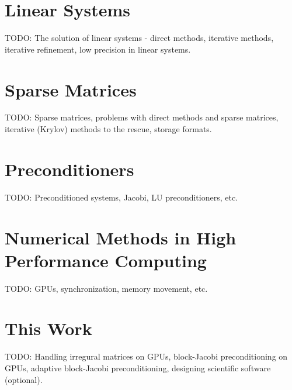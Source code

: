 

\section{Linear Systems}
TODO: The solution of linear systems - direct methods, iterative methods,
      iterative refinement, low precision in linear systems.

\section{Sparse Matrices}
TODO: Sparse matrices, problems with direct methods and sparse matrices,
      iterative (Krylov) methods to the rescue, storage formats.

\section{Preconditioners}
TODO: Preconditioned systems, Jacobi, LU preconditioners, etc.

\section{Numerical Methods in High Performance Computing}
TODO: GPUs, synchronization, memory movement, etc.

\section{This Work}
TODO: Handling irregural matrices on GPUs, block-Jacobi preconditioning on GPUs,
      adaptive block-Jacobi preconditioning, designing scientific software
      (optional).
